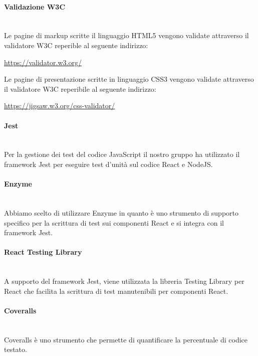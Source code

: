 	\paragraph{Validazione W3C}\mbox{}\\ [1mm]
	Le pagine di markup scritte il linguaggio HTML5 vengono validate attraverso il validatore W3C reperible al seguente indirizzo: 
	\begin{center}
		\url{https://validator.w3.org/}
	\end{center}
	Le pagine di presentazione scritte in linguaggio CSS3 vengono validate attraverso il validatore W3C reperibile al seguente indirizzo:
	\begin{center}
		\url{https://jigsaw.w3.org/css-validator/}
	\end{center}
	\paragraph{Jest}\mbox{}\\ [1mm]
	Per la gestione dei test del codice JavaScript il nostro gruppo ha utilizzato il framework Jest per eseguire test d'unità sul codice React e NodeJS.
	\paragraph{Enzyme}\mbox{}\\ [1mm]
	Abbiamo scelto di utilizzare Enzyme in quanto è uno strumento di supporto specifico per la scrittura di test sui componenti React e si integra con il framework Jest.
	\paragraph{React Testing Library}\mbox{}\\ [1mm]
	A supporto del framework Jest, viene utilizzata la libreria Testing Library per React che facilita la scrittura di test manutenibili per componenti React.
	\paragraph{Coveralls}\mbox{}\\ [1mm]
	Coveralls è uno strumento che permette di quantificare la percentuale di codice testato.
